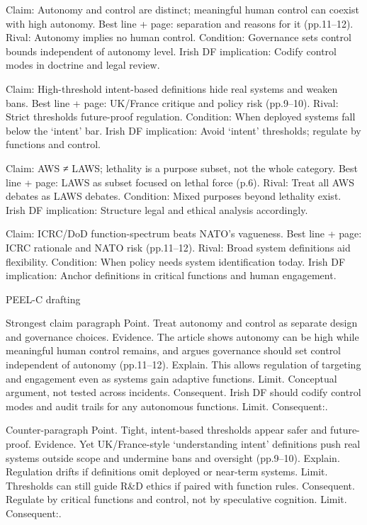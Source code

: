 Claim: Autonomy and control are distinct; meaningful human control can coexist with high autonomy.
Best line + page: separation and reasons for it (pp.11–12).
Rival: Autonomy implies no human control.
Condition: Governance sets control bounds independent of autonomy level.
Irish DF implication: Codify control modes in doctrine and legal review.

Claim: High-threshold intent-based definitions hide real systems and weaken bans.
Best line + page: UK/France critique and policy risk (pp.9–10).
Rival: Strict thresholds future-proof regulation.
Condition: When deployed systems fall below the ‘intent’ bar.
Irish DF implication: Avoid ‘intent’ thresholds; regulate by functions and control.

Claim: AWS ≠ LAWS; lethality is a purpose subset, not the whole category.
Best line + page: LAWS as subset focused on lethal force (p.6).
Rival: Treat all AWS debates as LAWS debates.
Condition: Mixed purposes beyond lethality exist.
Irish DF implication: Structure legal and ethical analysis accordingly.

Claim: ICRC/DoD function-spectrum beats NATO’s vagueness.
Best line + page: ICRC rationale and NATO risk (pp.11–12).
Rival: Broad system definitions aid flexibility.
Condition: When policy needs system identification today.
Irish DF implication: Anchor definitions in critical functions and human engagement.

PEEL-C drafting

Strongest claim paragraph
Point. Treat autonomy and control as separate design and governance choices.
Evidence. The article shows autonomy can be high while meaningful human control remains, and argues governance should set control independent of autonomy (pp.11–12).
Explain. This allows regulation of targeting and engagement even as systems gain adaptive functions.
Limit. Conceptual argument, not tested across incidents.
Consequent. Irish DF should codify control modes and audit trails for any autonomous functions. Limit. Consequent:.

Counter-paragraph
Point. Tight, intent-based thresholds appear safer and future-proof.
Evidence. Yet UK/France-style ‘understanding intent’ definitions push real systems outside scope and undermine bans and oversight (pp.9–10).
Explain. Regulation drifts if definitions omit deployed or near-term systems.
Limit. Thresholds can still guide R&D ethics if paired with function rules.
Consequent. Regulate by critical functions and control, not by speculative cognition. Limit. Consequent:.

